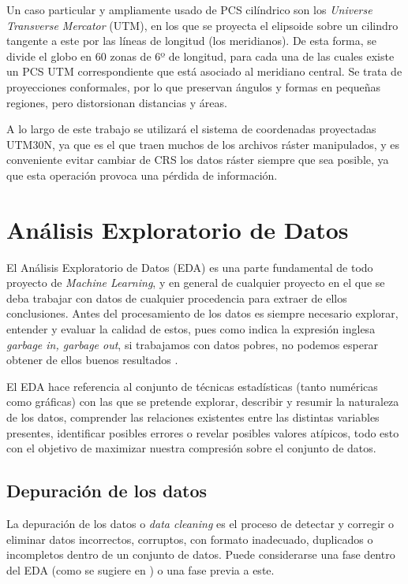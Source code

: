 \documentclass[12pt,a4paper,]{book}
\numberwithin{dummy}{section}
\theoremstyle{ocrenumbox}
\theoremstyle{blacknumex}
\theoremstyle{blacknumbox}
\theoremstyle{ocrenum}
\theoremstyle{ocrenum}
\begin{document}
Un caso particular y ampliamente usado de PCS cilíndrico son los
\emph{Universe Transverse Mercator} (UTM), en los que se proyecta el
elipsoide sobre un cilindro tangente a este por las líneas de longitud
(los meridianos). De esta forma, se divide el globo en 60 zonas de 6º de
longitud, para cada una de las cuales existe un PCS UTM correspondiente
que está asociado al meridiano central. Se trata de proyecciones
conformales, por lo que preservan ángulos y formas en pequeñas regiones,
pero distorsionan distancias y áreas.

A lo largo de este trabajo se utilizará el sistema de coordenadas
proyectadas UTM30N, ya que es el que traen muchos de los archivos ráster
manipulados, y es conveniente evitar cambiar de CRS los datos ráster
siempre que sea posible, ya que esta operación provoca una pérdida de
información.

\hypertarget{anuxe1lisis-exploratorio-de-datos}{%
\section{Análisis Exploratorio de
Datos}\label{anuxe1lisis-exploratorio-de-datos}}

El Análisis Exploratorio de Datos (EDA) es una parte fundamental de todo
proyecto de \emph{Machine Learning}, y en general de cualquier proyecto
en el que se deba trabajar con datos de cualquier procedencia para
extraer de ellos conclusiones. Antes del procesamiento de los datos es
siempre necesario explorar, entender y evaluar la calidad de estos, pues
como indica la expresión inglesa \emph{garbage in, garbage out}, si
trabajamos con datos pobres, no podemos esperar obtener de ellos buenos
resultados \citep{wickham2016r}.

El EDA hace referencia al conjunto de técnicas estadísticas (tanto
numéricas como gráficas) con las que se pretende explorar, describir y
resumir la naturaleza de los datos, comprender las relaciones existentes
entre las distintas variables presentes, identificar posibles errores o
revelar posibles valores atípicos, todo esto con el objetivo de
maximizar nuestra compresión sobre el conjunto de datos.

\hypertarget{depuraciuxf3n-de-los-datos}{%
\subsection{Depuración de los datos}\label{depuraciuxf3n-de-los-datos}}

La depuración de los datos o \emph{data cleaning} es el proceso de
detectar y corregir o eliminar datos incorrectos, corruptos, con formato
inadecuado, duplicados o incompletos dentro de un conjunto de datos.
Puede considerarse una fase dentro del EDA (como se sugiere en
\citet{wickham2016r}) o una fase previa a este.
\end{document}
